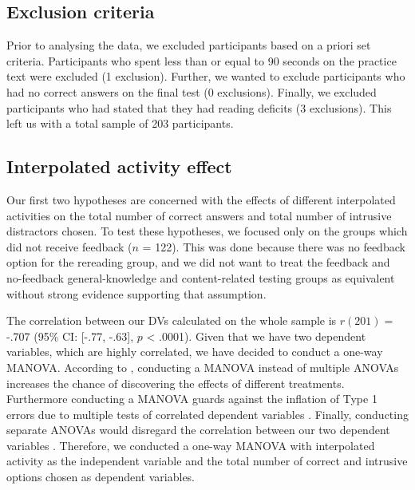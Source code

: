 

\hypertarget{exclusion-criteria}{%
\subsection{Exclusion criteria}\label{exclusion-criteria}}

Prior to analysing the data, we excluded participants based on a priori
set criteria. Participants who spent less than or equal to 90 seconds on
the practice text were excluded (1 exclusion). Further, we wanted to
exclude participants who had no correct answers on the final test (0
exclusions). Finally, we excluded participants who had stated that they
had reading deficits (3 exclusions). This left us with a total sample of
203 participants.

\hypertarget{interpolated-activity-effect}{%
\subsection{Interpolated activity
effect}\label{interpolated-activity-effect}}

Our first two hypotheses are concerned with the effects of different
interpolated activities on the total number of correct answers and total
number of intrusive distractors chosen. To test these hypotheses, we
focused only on the groups which did not receive feedback (\(n\) = 122).
This was done because there was no feedback option for the rereading
group, and we did not want to treat the feedback and no-feedback
general-knowledge and content-related testing groups as equivalent
without strong evidence supporting that assumption.

The correlation between our DVs calculated on the whole sample is
\(r(201) =\) -.707 (95\% CI: {[}-.77, -.63{]}, \(p\) \textless{} .0001).
Given that we have two dependent variables, which are highly correlated,
we have decided to conduct a one-way MANOVA. According to
\citet{tabachnickUsingMultivariateStatistics2012}, conducting a MANOVA
instead of multiple ANOVAs increases the chance of discovering the
effects of different treatments. Furthermore conducting a MANOVA guards
against the inflation of Type 1 errors due to multiple tests of
correlated dependent variables
\citep{tabachnickUsingMultivariateStatistics2012,fieldDiscoveringStatisticsUsing2012}.
Finally, conducting separate ANOVAs would disregard the correlation
between our two dependent variables
\citep{fieldDiscoveringStatisticsUsing2012}. Therefore, we conducted a
one-way MANOVA with interpolated activity as the independent variable
and the total number of correct and intrusive options chosen as
dependent variables.


